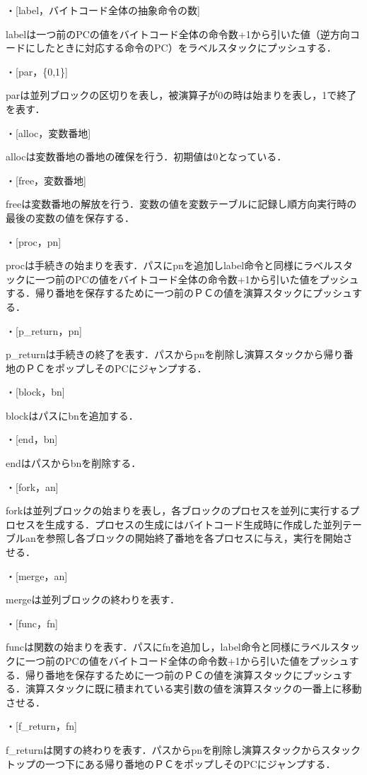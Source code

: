 \documentclass[submit,PRO]{ipsj}
\begin{document}
・[label，バイトコード全体の抽象命令の数]

labelは一つ前のPCの値をバイトコード全体の命令数+1から引いた値（逆方向コードにしたときに対応する命令のPC）をラベルスタックにプッシュする．


・[par，\{0,1\}]

parは並列ブロックの区切りを表し，被演算子が0の時は始まりを表し，1で終了を表す．



・[alloc，変数番地]

allocは変数番地の番地の確保を行う．初期値は0となっている．



・[free，変数番地]

freeは変数番地の解放を行う．変数の値を変数テーブルに記録し順方向実行時の最後の変数の値を保存する．


・[proc，pn]

procは手続きの始まりを表す．パスにpnを追加しlabel命令と同様にラベルスタックに一つ前のPCの値をバイトコード全体の命令数+1から引いた値をプッシュする．帰り番地を保存するために一つ前のＰＣの値を演算スタックにプッシュする．

・[p\_return，pn]

p\_returnは手続きの終了を表す．パスからpnを削除し演算スタックから帰り番地のＰＣをポップしそのPCにジャンプする．


・[block，bn]

blockはパスにbnを追加する．


・[end，bn]

endはパスからbnを削除する．

・[fork，an]

forkは並列ブロックの始まりを表し，各ブロックのプロセスを並列に実行するプロセスを生成する．プロセスの生成にはバイトコード生成時に作成した並列テーブルanを参照し各ブロックの開始終了番地を各プロセスに与え，実行を開始させる．


・[merge，an]

mergeは並列ブロックの終わりを表す．


・[func，fn]

funcは関数の始まりを表す．パスにfnを追加し，label命令と同様にラベルスタックに一つ前のPCの値をバイトコード全体の命令数+1から引いた値をプッシュする．帰り番地を保存するために一つ前のＰＣの値を演算スタックにプッシュする．演算スタックに既に積まれている実引数の値を演算スタックの一番上に移動させる．


・[f\_return，fn]

f\_returnは関すの終わりを表す．パスからpnを削除し演算スタックからスタックトップの一つ下にある帰り番地のＰＣをポップしそのPCにジャンプする．
\end{document}
